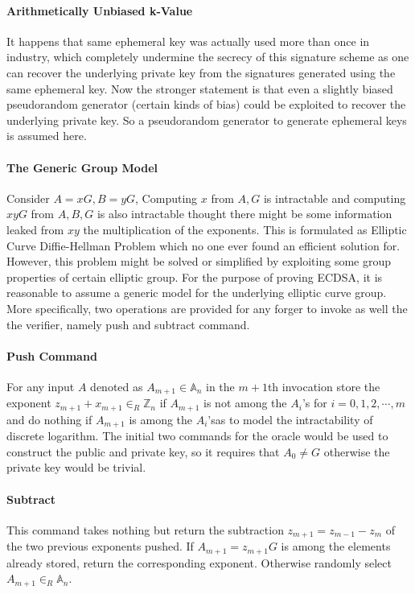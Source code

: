 \documentclass[18]{article}
\begin{document}
\paragraph{Arithmetically Unbiased k-Value}
It happens that same ephemeral key was actually used more than once in industry, which completely undermine the secrecy of this signature scheme as one can recover the underlying private key from the signatures generated using the same ephemeral key.
Now the stronger statement is that even a slightly biased pseudorandom generator (certain kinds of bias) could be exploited to recover the underlying private key.
So a pseudorandom generator to generate ephemeral keys is assumed here.

\paragraph{The Generic Group Model}
Consider $A=xG,B=yG$, Computing $x$ from $A,G$ is intractable and computing $xyG$ from $A,B,G$ is also intractable thought there might be some information leaked from $xy$ the multiplication of the exponents. This is formulated as Elliptic Curve Diffie-Hellman Problem which no one ever found an efficient solution for. However, this problem might be solved or simplified by exploiting some group properties of certain elliptic group. For the purpose of proving ECDSA, it is reasonable to assume a generic model for the underlying elliptic curve group. More specifically, two operations are provided for any forger to invoke as well the the verifier, namely push and subtract command.\\
\paragraph{Push Command}
For any input $A$ denoted as $A_{m+1}\in \mathbb{A}_n$ in the $m+1$th invocation store the exponent $z_{m+1}+x_{m+1}\in_R\mathbb{Z}_n$ if $A_{m+1}$ is not among the $A_i$'s for $i=0,1,2,\cdots,m$ and do nothing if $A_{m+1}$ is among the $A_i$'sas to model the intractability of discrete logarithm. The initial two commands for the oracle would be used to construct the public and private key, so it requires that $A_0\neq G$ otherwise the private key would be trivial.
\paragraph{Subtract}
This command takes nothing but return the subtraction $z_{m+1}=z_{m-1}-z_m$ of the two previous exponents pushed. If $A_{m+1}=z_{m+1}G$ is among the elements already stored, return the corresponding exponent. Otherwise randomly select $A_{m+1} \in _R \mathbb{A}_n$.
\end{document}
